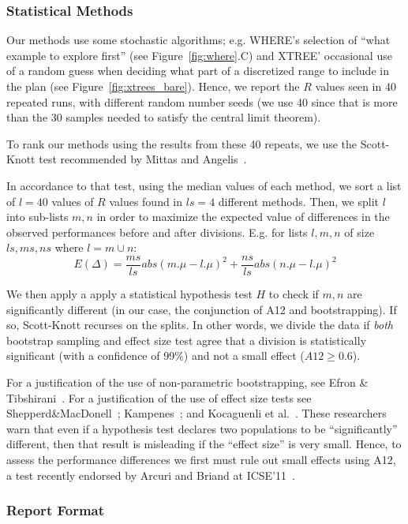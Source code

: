 \documentclass{sig-alternate}
\newcommand{\fig}[1]{Figure~\ref{fig:#1}}
\begin{document}
{\begin{itemize}[leftmargin=3mm]
\subsubsection{Statistical Methods}
Our methods use some stochastic algorithms; e.g. WHERE's selection of ``what example to explore first'' (see \fig{where}.C) and XTREE' occasional use of a random guess when deciding what part of a discretized range to include in the plan (see \fig{xtrees_bare}). Hence, we report the $R$ values seen in 40 repeated runs, with different random number seeds (we use 40 since that is  more than the 30 samples  needed to satisfy the central limit theorem).

To rank our methods using the results from these 40 repeats, we use the Scott-Knott test recommended by Mittas and Angelis~\cite{mittas13}. 

In accordance to that test, using the median values of each method, we
sort a list of  $l=40$ values of $R$ values found in  $ls=4$ different methods. 
Then, we split $l$ into sub-lists $m,n$ in order to maximize the expected value of differences  in the observed performances before and after divisions. E.g. for lists $l,m,n$ of size $ls,ms,ns$ where $l=m\cup n$: \[E(\Delta)=\frac{ms}{ls}abs(m.\mu - l.\mu)^2 + \frac{ns}{ls}abs(n.\mu - l.\mu)^2\]

We then apply a apply a statistical hypothesis test $H$ to check
if $m,n$ are significantly different  (in our case, the conjunction of A12 and bootstrapping). If so, Scott-Knott recurses on the splits. In other words, we divide the data if \textit{both} bootstrap sampling and effect size test agree that a division is statistically significant (with a confidence of 99\%) and not a small effect ($A12 \ge 0.6$).

For a justification of the use of non-parametric bootstrapping, see Efron \& Tibshirani~\cite[p220-223]{efron93}. For a justification of the use of effect size tests see Shepperd\&MacDonell~\cite{shepperd12a}; Kampenes~\cite{kampenes07}; and Kocaguenli et al.~\cite{Kocaguneli2013:ep}. These researchers warn that even if a hypothesis test declares two populations to be ``significantly'' different, then that result is misleading if the ``effect size'' is very small. Hence, to assess the performance differences we first must rule out small effects using A12, a test   recently endorsed by Arcuri and Briand at ICSE'11~\cite{arcuri11}.



\subsubsection{Report Format}


\end{itemize}}
\end{document}
